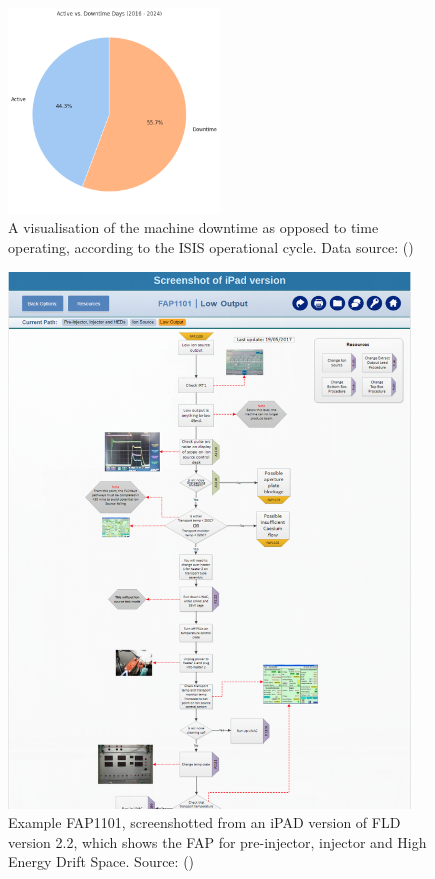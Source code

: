 \documentclass[10pt,oneside]{report}
\begin{document}
\begin{figure}[htbp]
    \centering
    \includegraphics[width=0.5\textwidth]{isisDowntime.png}
    \caption{A visualisation of the machine downtime as opposed to time operating, according to the ISIS operational cycle. Data source: (\citet{isisbeamoperations2024})}\label{fig:isisDowntime}
\end{figure}
\begin{figure}[htbp]
    \centering
    \includegraphics[width=0.95\textwidth]{fap.png}
    \caption{Example FAP1101, screenshotted from an iPAD version of FLD version 2.2, which shows the FAP for pre-injector, injector and High Energy Drift Space. Source: (\citet{fld2017})}\label{fig:fap}
\end{figure}
\end{document}
